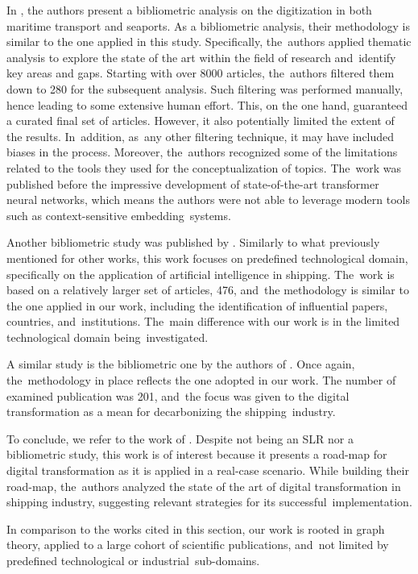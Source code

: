 \documentclass[jmse,review,accept,pdftex,moreauthors]{Definitions/mdpi}
\begin{document}
In \citep{jovic2022digitalization}, the authors present a bibliometric analysis on the digitization in both maritime transport and seaports. As a bibliometric analysis, their methodology is similar to the one applied in this study. Specifically, the~authors applied thematic analysis to explore the state of the art within the field of research and~identify key areas and gaps. Starting with over 8000 articles, the~authors filtered them down to 280 for the subsequent analysis. Such filtering was performed manually, hence leading to some extensive human effort. This, on the one hand, guaranteed a curated final set of articles. However, it also potentially limited the extent of the results. In~addition, as~any other filtering technique, it may have included biases in the process. Moreover, the~authors recognized some of the limitations related to the tools they used for the conceptualization of topics. The~work was published before the impressive development of state-of-the-art transformer neural networks, which means the authors were not able to leverage modern tools such as context-sensitive embedding~systems.

Another bibliometric study was published by \citep{xiao2024application}. Similarly to what previously mentioned for other works, this work focuses on predefined technological domain, specifically on the application of artificial intelligence in shipping. The~work is based on a relatively larger set of articles, 476, and~the methodology is similar to the one applied in our work, including the identification of influential papers, countries, and~institutions. The~main difference with our work is in the limited technological domain being~investigated.

A similar study is the bibliometric one by the authors of \citep{xiao2025application}. Once again, the~methodology in place reflects the one adopted in our work. The number of examined publication was 201, and~the focus was given to the digital transformation as a mean for decarbonizing the shipping~industry.

To conclude, we refer to the work of \citep{filippopoulos2022road}. Despite not being an SLR nor a bibliometric study, this work is of interest because it presents a road-map for digital transformation as it is applied in a real-case scenario. While building their road-map, the~authors analyzed the state of the art of digital transformation in shipping industry, suggesting relevant strategies for its successful~implementation.

In comparison to the works cited in this section, our work is rooted in graph theory, applied to a large cohort of scientific publications, and~not limited by predefined technological or industrial~sub-domains.
\end{document}
